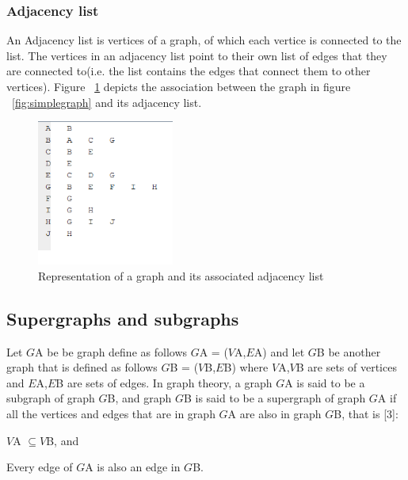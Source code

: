 \subsubsection{Adjacency list}
An Adjacency list is vertices of a graph, of which each vertice is connected to the list. The vertices in an adjacency list point to their own list of edges that they are connected to(i.e. the list contains the edges that connect them to other vertices). \newpage
Figure ~\ref{fig:adjacencylist} depicts the association between the graph in figure ~\ref{fig:simplegraph} and its adjacency list.
\begin{figure}[H]
  \begin{center}
      \includegraphics[width=0.4\textwidth]{list.png}
  \end{center}    
  \caption{Representation of a graph and its associated adjacency list}
  \label{fig:adjacencylist}
\end{figure}

\subsection{Supergraphs and subgraphs}
Let $G${\tiny A} be be graph define as follows $G${\tiny A} = ($V${\tiny A},$E${\tiny A}) and let $G${\tiny B} be another graph that is defined as follows $G${\tiny B} = ($V${\tiny B},$E${\tiny B}) where $V${\tiny A},$V${\tiny B} are sets of vertices and $E${\tiny A},$E${\tiny B} are sets of edges.
In graph theory, a graph $G${\tiny A} is said to be a subgraph of graph $G${\tiny B}, and graph $G${\tiny B} is said to be a supergraph of graph $G${\tiny A} if all the vertices and edges that are in graph $G${\tiny A} are also in graph $G${\tiny B}, that is [3]:

\begin{myEnumerate}
  \item $V${\tiny A} $ \subseteq V${\tiny B}, and
  \item Every edge of $G${\tiny A} is also an edge in $G${\tiny B}.
\end{myEnumerate}

